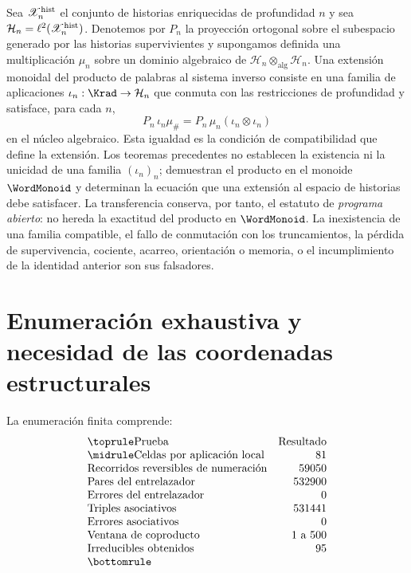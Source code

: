 Sea \(\mathscr X_n^{\rm hist}\) el conjunto de historias enriquecidas de
profundidad \(n\) y sea
\(\mathcal H_n=\ell^2(\mathscr X_n^{\rm hist})\). Denotemos por \(P_n\) la
proyección ortogonal sobre el subespacio generado por las historias
supervivientes y supongamos definida una multiplicación \(\mu_n\) sobre un
dominio algebraico de
\(\mathcal H_n\otimes_{\mathrm{alg}}\mathcal H_n\). Una extensión monoidal
del producto de palabras al sistema inverso consiste en una familia de
aplicaciones \(\iota_n:\Krad\to\mathcal H_n\) que conmuta con las
restricciones de profundidad y satisface, para cada \(n\),
\[
 P_n\,\iota_n\mu_\#
 =P_n\,\mu_n
 (\iota_n\otimes\iota_n)
\]
en el núcleo algebraico. Esta igualdad es la condición de compatibilidad que
define la extensión. Los teoremas precedentes no establecen la existencia ni
la unicidad de una familia \((\iota_n)_n\); demuestran el producto en el
monoide \(\WordMonoid\) y determinan la ecuación que una extensión al espacio
de historias debe satisfacer. La transferencia conserva, por tanto, el
estatuto de \emph{programa abierto}: no hereda la exactitud del producto en
\(\WordMonoid\). La inexistencia de una familia compatible, el fallo de
conmutación con los truncamientos, la pérdida de supervivencia, cociente,
acarreo, orientación o memoria, o el incumplimiento de la identidad anterior
son sus falsadores.
\fi

\section{Enumeración exhaustiva y necesidad de las coordenadas estructurales}

La enumeración finita comprende:
\[
\begin{array}{@{}lr@{}}
\toprule
\text{Prueba}&\text{Resultado}\\\midrule
\text{Celdas por aplicación local}&81\\
\text{Recorridos reversibles de numeración}&59050\\
\text{Pares del entrelazador}&532900\\
\text{Errores del entrelazador}&0\\
\text{Triples asociativos}&531441\\
\text{Errores asociativos}&0\\
\text{Ventana de coproducto}&1\text{ a }500\\
\text{Irreducibles obtenidos}&95\\
\bottomrule
\end{array}
\]

